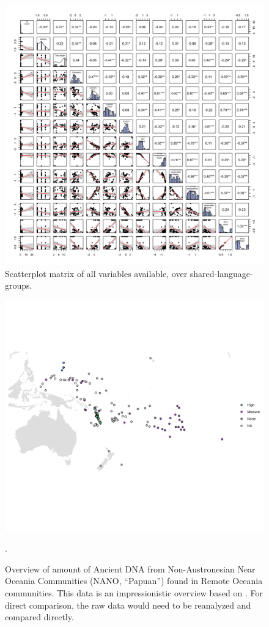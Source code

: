 \documentclass[unnumsec,webpdf,modern,medium]{oup-authoring-template}
\begin{document}
\begin{figure}[ht]
\centering
\includegraphics[width=\textwidth]{SPLOM_medium_all_variables.png}
\caption{Scatterplot matrix of all variables available, over shared-language-groups.}
\label{appendix_SPLOM_medium_all_variables}
\end{figure}

\begin{figure}[ht]
\centering
\includegraphics[width=\textwidth]{NANO_contact_map.png}
\caption{Overview of amount of Ancient DNA from Non-Austronesian Near Oceania Communities (NANO, ``Papuan'') found in Remote Oceania communities. This data is an impressionistic overview based on \citep{posth_jena_ancient_dna_vanuatu_2018, lipson_harvad_ancient_dna_vanuatu_2018, liu2022ancient}. For direct comparison, the raw data would need to be reanalyzed and compared directly.}
\label{appendix_NANO_contact_map}.
\end{figure}
\end{document}
